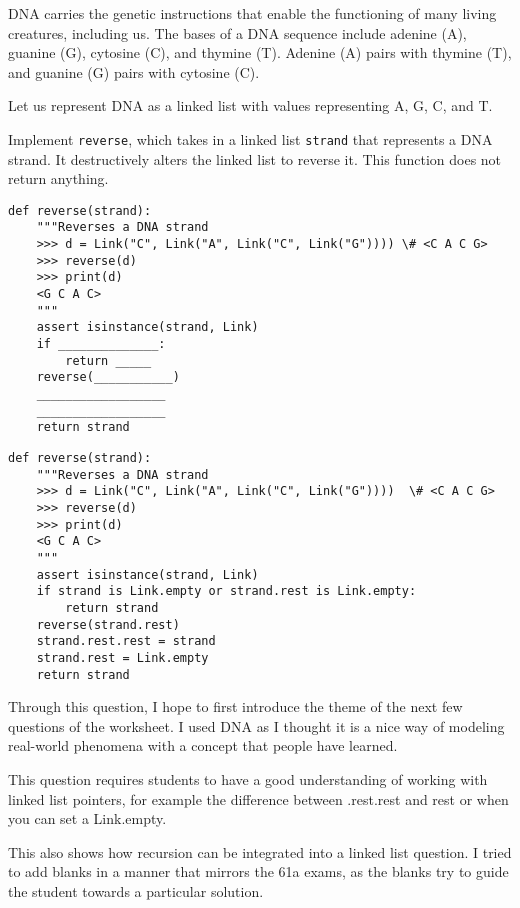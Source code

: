 \begin{blocksection}
\question DNA carries the genetic instructions that enable the functioning of many living creatures, including us. The bases of a DNA sequence include adenine (A), guanine (G), cytosine (C), and thymine (T). Adenine (A) pairs with thymine (T), and guanine (G) pairs with cytosine (C).

Let us represent DNA as a linked list with values representing A, G, C, and T.

Implement \texttt{reverse}, which takes in a linked list \texttt{strand} that represents a DNA strand. It destructively alters the linked list to reverse it. This function does not return anything.

\begin{lstlisting}
def reverse(strand):
    """Reverses a DNA strand 
    >>> d = Link("C", Link("A", Link("C", Link("G")))) \# <C A C G>
    >>> reverse(d)
    >>> print(d)
    <G C A C>
    """
    assert isinstance(strand, Link)
    if ______________:
        return _____
    reverse(___________)
    __________________
    __________________
    return strand
\end{lstlisting}

\begin{solution}
\begin{lstlisting}
def reverse(strand):
    """Reverses a DNA strand 
    >>> d = Link("C", Link("A", Link("C", Link("G"))))  \# <C A C G>
    >>> reverse(d)
    >>> print(d)
    <G C A C>
    """
    assert isinstance(strand, Link)
    if strand is Link.empty or strand.rest is Link.empty:
        return strand
    reverse(strand.rest)
    strand.rest.rest = strand
    strand.rest = Link.empty
    return strand
\end{lstlisting}
\end{solution}

\begin{questionmeta}
Through this question, I hope to first introduce the theme of the next few questions of the worksheet. I used DNA as I thought it is a nice way of modeling real-world phenomena with a concept that people have learned.

This question requires students to have a good understanding of working with linked list pointers, for example the difference between .rest.rest and rest or when you can set a Link.empty.

This also shows how recursion can be integrated into a linked list question. I tried to add blanks in a manner that mirrors the 61a exams, as the blanks try to guide the student towards a particular solution.
\end{questionmeta}
\end{blocksection}